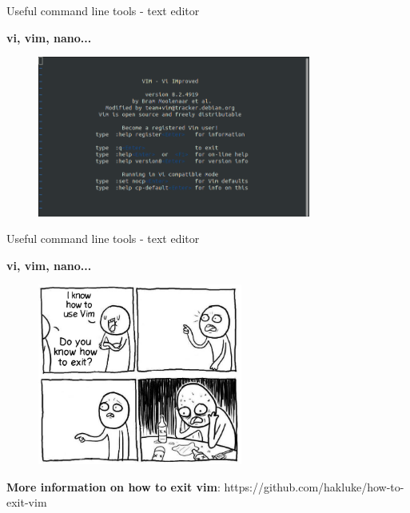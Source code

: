 \documentclass[10pt]{beamer}
\begin{document}
\begin{frame}[fragile]{Useful command line tools - text editor}

\textbf{vi, vim\footnotemark, nano\footnotemark... }

\begin{figure}[!ht]
\centering
\includegraphics[width = 0.8\textwidth]{images/vi.png}
\end{figure}


\end{frame}

\begin{frame}[fragile]{Useful command line tools - text editor}

\textbf{vi, vim, nano... }

\begin{figure}[!ht]
\centering
\includegraphics[width = 0.6\textwidth]{images/vim_meme.jpg}
\end{figure}

\scriptsize{\textbf{More information on how to exit vim}: https://github.com/hakluke/how-to-exit-vim}

\end{frame}
\end{document}
